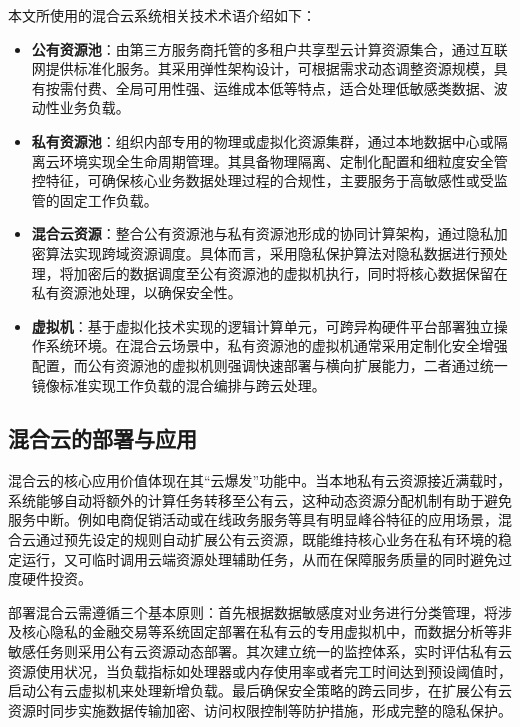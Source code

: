 本文所使用的混合云系统相关技术术语介绍如下：
\begin{itemize}
    \item \textbf{公有资源池}：由第三方服务商托管的多租户共享型云计算资源集合，通过互联网提供标准化服务。其采用弹性架构设计，可根据需求动态调整资源规模，具有按需付费、全局可用性强、运维成本低等特点，适合处理低敏感类数据、波动性业务负载。

    \item \textbf{私有资源池}：组织内部专用的物理或虚拟化资源集群，通过本地数据中心或隔离云环境实现全生命周期管理。其具备物理隔离、定制化配置和细粒度安全管控特征，可确保核心业务数据处理过程的合规性，主要服务于高敏感性或受监管的固定工作负载。

    \item \textbf{混合云资源}：整合公有资源池与私有资源池形成的协同计算架构，通过隐私加密算法实现跨域资源调度。具体而言，采用隐私保护算法对隐私数据进行预处理，将加密后的数据调度至公有资源池的虚拟机执行，同时将核心数据保留在私有资源池处理，以确保安全性\cite{shishidoOptimizingSecurityCost2021, leiHunheYunHuanjing2023}。

    \item \textbf{虚拟机}：基于虚拟化技术实现的逻辑计算单元，可跨异构硬件平台部署独立操作系统环境。在混合云场景中，私有资源池的虚拟机通常采用定制化安全增强配置，而公有资源池的虚拟机则强调快速部署与横向扩展能力，二者通过统一镜像标准实现工作负载的混合编排与跨云处理。
\end{itemize}

\subsection{混合云的部署与应用}

混合云的核心应用价值体现在其“云爆发”功能中。当本地私有云资源接近满载时，系统能够自动将额外的计算任务转移至公有云，这种动态资源分配机制有助于避免服务中断。例如电商促销活动或在线政务服务等具有明显峰谷特征的应用场景，混合云通过预先设定的规则自动扩展公有云资源，既能维持核心业务在私有环境的稳定运行，又可临时调用云端资源处理辅助任务，从而在保障服务质量的同时避免过度硬件投资。

部署混合云需遵循三个基本原则：首先根据数据敏感度对业务进行分类管理，将涉及核心隐私的金融交易等系统固定部署在私有云的专用虚拟机中，而数据分析等非敏感任务则采用公有云资源动态部署。其次建立统一的监控体系，实时评估私有云资源使用状况，当负载指标如处理器或内存使用率或者完工时间达到预设阈值时，启动公有云虚拟机来处理新增负载。最后确保安全策略的跨云同步，在扩展公有云资源时同步实施数据传输加密、访问权限控制等防护措施，形成完整的隐私保护。

